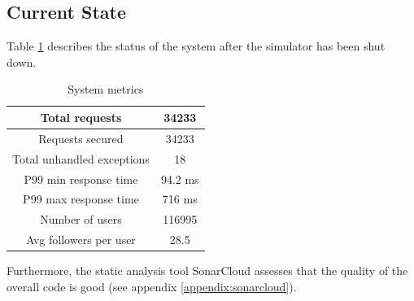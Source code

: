 \subsection{Current State}
Table \ref{current-table} describes the status of the system after the simulator has been shut down.
\begin{table}[H]
    \begin{center}
        \begin{tabular}{ |c|c| }
            \hline
            Total requests & 34233 \\
            \hline
            Requests secured & 34233 \\
            \hline
            Total unhandled exceptions & 18 \\
            \hline
            P99 min response time & 94.2 ms \\
            \hline
            P99 max response time & 716 ms \\
            \hline
            Number of users &  116995\\
            \hline
            Avg followers per user &  28.5\\
            \hline
        \end{tabular}
    \end{center}
    \caption{System metrics}
    \label{current-table}
\end{table}
Furthermore, the static analysis tool SonarCloud assesses that the quality of the overall code is good (see appendix \ref{appendix:sonarcloud}).
